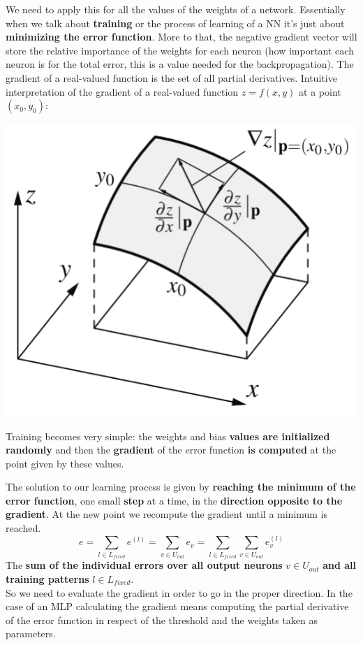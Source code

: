 \documentclass[11pt]{article}
\begin{document}
		We need to apply this for all the values of the weights of a network. Essentially when we talk about \textbf{training} or the process of learning of a NN it's just about \textbf{minimizing the error function}. More to that, the negative gradient vector will store the relative importance of the weights for each neuron (how important each neuron is for the total error, this is a value needed for the backpropagation). The gradient of a real-valued function is the set of all partial derivatives. Intuitive interpretation of the gradient of a real-valued function $z = f (x, y)$ at a point $(x_0, y_0)$:
		\begin{center}
			\includegraphics[width=0.5\columnwidth]{img/NN/gradient1}
		\end{center}
		
		Training becomes very simple: the weights and bias \textbf{values are initialized randomly} and then the \textbf{gradient} of the error function \textbf{is computed} at the point given by these values.\\
		
		\newpage
		
		The solution to our learning process is given by \textbf{reaching the minimum of the error function}, one small \textbf{step} at a time, in the \textbf{direction opposite to the gradient}. At the new point we recompute the gradient until a minimum is reached.
		$$ e = \sum_{l \in L_{fixed}} e^{(l)} = \sum_{v \in U_{out}} e_v = \sum_{l \in L_{fixed}} \sum_{v \in U_{out}} e_v^{(l)} $$
		The \textbf{sum of the individual errors over all output neurons} $v \in U_{{out}}$ \textbf{and all training patterns} $l \in L_{fixed}$.\\
		
		So we need to evaluate the gradient in order to go in the proper direction. In the case of an MLP calculating the gradient means computing the partial derivative of the error function in respect of the threshold and the weights taken as parameters.\\
		
\end{document}
